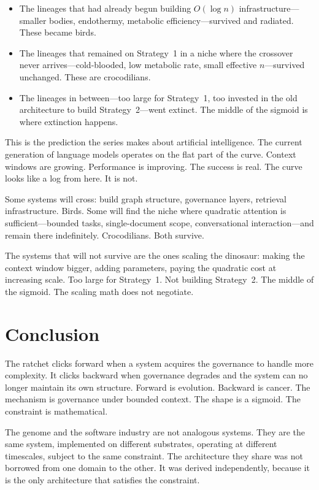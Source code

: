 \documentclass[11pt]{article}
\theoremstyle{definition}
\begin{document}
\begin{itemize}
\item The lineages that had already begun building $O(\log n)$
   infrastructure---smaller bodies, endothermy, metabolic
   efficiency---survived and radiated. These became birds.
\item The lineages that remained on Strategy~1 in a niche where
   the crossover never arrives---cold-blooded, low metabolic rate,
   small effective $n$---survived unchanged. These are crocodilians.
\item The lineages in between---too large for Strategy~1, too
   invested in the old architecture to build Strategy~2---went
   extinct. The middle of the sigmoid is where extinction happens.
\end{itemize}

This is the prediction the series makes about artificial intelligence.
The current generation of language models operates on the flat part of
the curve. Context windows are growing. Performance is improving.
The success is real. The curve looks like a log from here. It is not.

Some systems will cross: build graph structure, governance layers,
retrieval infrastructure. Birds. Some will find the niche where
quadratic attention is sufficient---bounded tasks, single-document
scope, conversational interaction---and remain there indefinitely.
Crocodilians. Both survive.

The systems that will not survive are the ones scaling the dinosaur:
making the context window bigger, adding parameters, paying the
quadratic cost at increasing scale. Too large for Strategy~1. Not
building Strategy~2. The middle of the sigmoid. The scaling math
does not negotiate.

\section{Conclusion}
\label{sec:conclusion}

The ratchet clicks forward when a system acquires the governance to
handle more complexity. It clicks backward when governance degrades
and the system can no longer maintain its own structure. Forward is
evolution. Backward is cancer. The mechanism is governance under
bounded context. The shape is a sigmoid. The constraint is
mathematical.

The genome and the software industry are not analogous systems. They
are the same system, implemented on different substrates, operating
at different timescales, subject to the same constraint. The
architecture they share was not borrowed from one domain to the other.
It was derived independently, because it is the only architecture
that satisfies the constraint.
\end{document}
